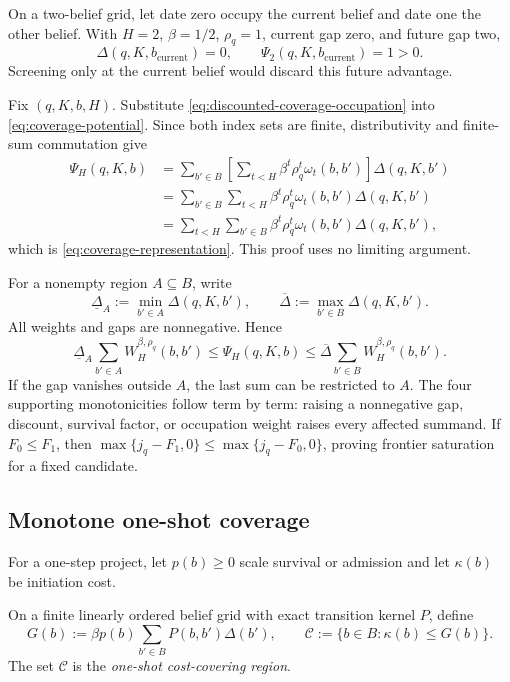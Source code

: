 \begin{example}
\label{ex:delayed-coverage}
On a two-belief grid, let date zero occupy the current belief and date one the
other belief.  With \(H=2\), \(\beta=1/2\), \(\rho_q=1\), current gap zero,
and future gap two,
\[
  \Delta(q,K,b_{\mathrm{current}})=0,
  \qquad
  \Psi_2(q,K,b_{\mathrm{current}})=1>0.
\]
Screening only at the current belief would discard this future advantage.
\end{example}

Fix \((q,K,b,H)\).  Substitute
\eqref{eq:discounted-coverage-occupation} into
\eqref{eq:coverage-potential}.  Since both index sets are finite,
distributivity and finite-sum commutation give
\[
\begin{aligned}
 \Psi_H(q,K,b)
 &=\sum_{b'\in B}
   \left[\sum_{t<H}\beta^t\rho_q^t\omega_t(b,b')\right]
   \Delta(q,K,b')\\
 &=\sum_{b'\in B}\sum_{t<H}
   \beta^t\rho_q^t\omega_t(b,b')\Delta(q,K,b')\\
 &=\sum_{t<H}\sum_{b'\in B}
   \beta^t\rho_q^t\omega_t(b,b')\Delta(q,K,b'),
\end{aligned}
\]
which is \eqref{eq:coverage-representation}.  This proof uses no limiting
argument.

For a nonempty region \(A\subseteq B\), write
\[
 \underline\Delta_A:=\min_{b'\in A}\Delta(q,K,b'),
 \qquad
 \overline\Delta:=\max_{b'\in B}\Delta(q,K,b').
\]
All weights and gaps are nonnegative.  Hence
\[
 \underline\Delta_A
 \sum_{b'\in A}W_H^{\beta,\rho_q}(b,b')
 \le \Psi_H(q,K,b)
 \le
 \overline\Delta
 \sum_{b'\in B}W_H^{\beta,\rho_q}(b,b').
\]
If the gap vanishes outside \(A\), the last sum can be restricted to \(A\).
The four supporting monotonicities follow term by term: raising a
nonnegative gap, discount, survival factor, or occupation weight raises every
affected summand.  If \(F_0\le F_1\), then
\(\max\{j_q-F_1,0\}\le\max\{j_q-F_0,0\}\), proving frontier saturation for a
fixed candidate.

\subsection{Monotone one-shot coverage}

For a one-step project, let \(p(b)\ge0\) scale survival or admission and let
\(\kappa(b)\) be initiation cost.

\begin{definition}
\label{def:single-gap-region}
On a finite linearly ordered belief grid with exact transition kernel \(P\),
define
\[
  G(b):=\beta p(b)\sum_{b'\in B}P(b,b')\Delta(b'),
  \qquad
  \mathcal C:=\{b\in B:\kappa(b)\le G(b)\}.
\]
The set \(\mathcal C\) is the \emph{one-shot cost-covering region}.
\end{definition}

